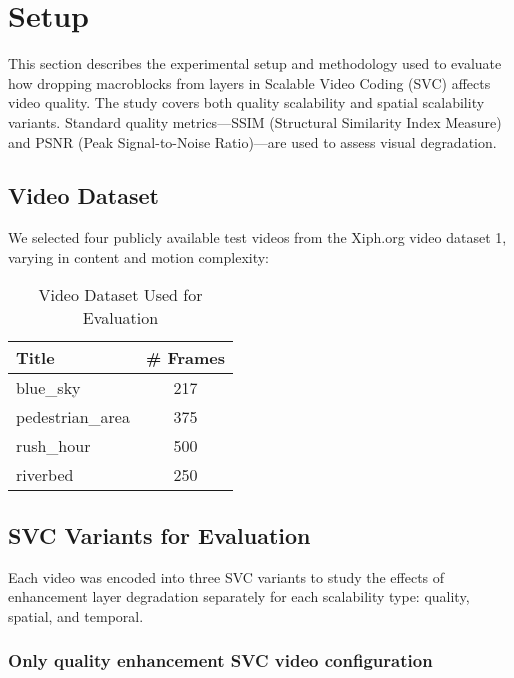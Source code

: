 
\section{Setup}


This section describes the experimental setup and methodology used to evaluate
how dropping macroblocks from layers in Scalable Video Coding
(SVC) affects video quality. The study covers both quality scalability and
spatial scalability variants. Standard quality metrics—SSIM (Structural
Similarity Index Measure) and PSNR (Peak Signal-to-Noise Ratio)—are used to
assess visual degradation.

\subsection{Video Dataset}


We selected four publicly available test videos from the Xiph.org video dataset
1, varying in content and motion complexity:

\begin{table}[H]
    \centering
    \begin{tabular}{l|c}
        \toprule
        Title               & \# Frames \\
        \midrule
        blue\_sky           & 217 \\
        pedestrian\_area    & 375 \\
        rush\_hour          & 500 \\
        riverbed            & 250 \\
        \bottomrule
    \end{tabular}
    \caption{Video Dataset Used for Evaluation}
    \label{tab:video_dataset}
\end{table}


\subsection{SVC Variants for Evaluation}

Each video was encoded into three SVC variants to study the effects of
enhancement layer degradation separately for each scalability type: quality,
spatial, and temporal.

\subsubsection{Only quality enhancement SVC video configuration}

